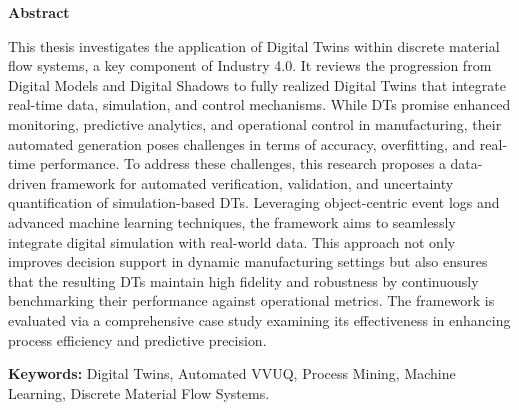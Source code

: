 \thispagestyle{plain} %

\vspace*{1.5in} %

\begin{center}
  {\Large \textbf{Abstract}}
\end{center}

This thesis investigates the application of Digital Twins within discrete material flow systems, a key component of Industry 4.0. It reviews the progression from Digital Models and Digital Shadows to fully realized Digital Twins that integrate real-time data, simulation, and control mechanisms. While DTs promise enhanced monitoring, predictive analytics, and operational control in manufacturing, their automated generation poses challenges in terms of accuracy, overfitting, and real-time performance. To address these challenges, this research proposes a data-driven framework for automated verification, validation, and uncertainty quantification of simulation-based DTs. Leveraging object-centric event logs and advanced machine learning techniques, the framework aims to seamlessly integrate digital simulation with real-world data. This approach not only improves decision support in dynamic manufacturing settings but also ensures that the resulting DTs maintain high fidelity and robustness by continuously benchmarking their performance against operational metrics. The framework is evaluated via a comprehensive case study examining its effectiveness in enhancing process efficiency and predictive precision.

\medskip

\textbf{Keywords:} Digital Twins, Automated VVUQ, Process Mining, Machine Learning, Discrete Material Flow Systems.

\clearpage